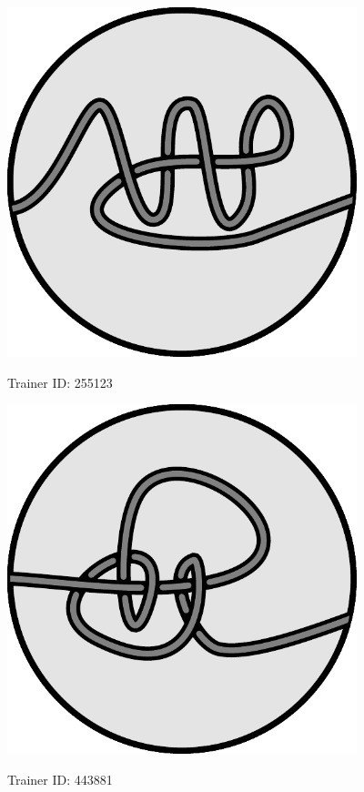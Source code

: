   \begin{center}
    \includegraphics[width=4in]{assets/unknot2.pdf}

    \Huge Trainer ID: 255123 
%
%
  \end{center}

  \begin{center}
%
    \includegraphics[width=4in]{assets/knot2.pdf}

    \Huge Trainer ID: 443881 
%
%
%
  \end{center}

